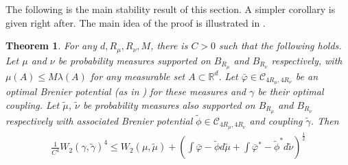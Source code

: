 \documentclass[11pt]{article}
\newtheorem{theorem}[lemma]{Theorem}
\newcommand{\R}{\mathbb R}
\newcommand{\1}{\mathbbm{1}}
\numberwithin{equation}{section}
\begin{document}
The following is the main stability result of this section. A simpler corollary is given right after. The main idea of the proof is illustrated in .
\begin{theorem}
    For any $d,R_\mu,R_\nu,M$, there is $C>0$ such that the following holds.
    Let $\mu$ and $\nu$ be probability measures supported on $B_{R_\mu}$ and $B_{R_\nu}$ respectively, with $\mu(A) \leq M \lambda(A)$ for any measurable set $A\subset\R^d$. Let  $\bar{\varphi} \in \mathcal{C}_{4R_\mu,4R_\nu}$  be an optimal Brenier potential (as in ) for these measures and  $\gamma$ be their optimal coupling. Let $\tilde{\mu}$, $\tilde{\nu}$ be probability measures also supported on $B_{R_\mu}$ and $B_{R_\nu}$ respectively with associated Brenier potential $\tilde{\phi} \in \mathcal{C}_{4R_\mu,4R_\nu}$ and coupling $\tilde{\gamma}$. Then
\begin{align*}
    \frac{1}{C^4} W_2(\gamma,\tilde{\gamma})^4 \leq W_2(\mu,\tilde{\mu}) + \left(\int \bar{\varphi} - \tilde{\phi} d\tilde{\mu} + \int \bar{\varphi}^* - \tilde{\phi}^* d\tilde{\nu} \right)^{\frac{1}{2}}
\end{align*}
    \label{th:stabilityCoupling}
\end{theorem}
\end{document}
